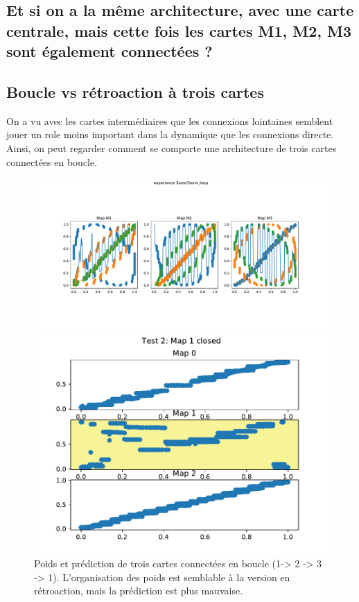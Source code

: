 \subsection{Et si on a la même architecture, avec une carte centrale, mais cette fois les cartes M1, M2, M3 sont également connectées ?}

\subsection{Boucle vs rétroaction à trois cartes}
On a vu avec les cartes intermédiaires que les connexions lointaines semblent jouer un role moins important dans la dynamique que les connexions directe. Ainsi, on peut regarder comment se comporte une architecture de trois cartes connectées en boucle.

\begin{figure}
\begin{minipage}{0.5\textwidth}
\includegraphics[width=\textwidth]{3som_loop_w.pdf}

\end{minipage}
\begin{minipage}{0.5\textwidth}
\includegraphics[width=\textwidth]{3som_loop_pred.pdf}
\end{minipage}
\caption{Poids et prédiction de trois cartes connectées en boucle (1-> 2 -> 3 -> 1). L'organisation des poids est semblable à la version en rétroaction, mais la prédiction est plus mauvaise.}
\label{fig:3som_loop}
\end{figure}


